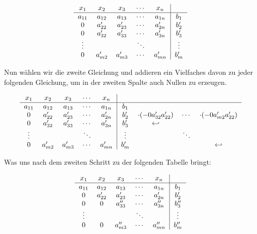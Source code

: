 			\[
				\begin{tabular} {ccccc|c}
					$x_1$ & $x_2$ & $x_3$ & $\cdots$ & $x_n$ &\\
					\hline
					$a_{11}$ & $a_{12}$ & $a_{13}$ & $\cdots$ & $a_{1n}$ & $b_1$\\
					0 & $a_{22}'$ & $a_{23}'$ & $\cdots$ & $a_{2n}'$ & $b_2'$\\
					0 & $a_{32}'$ & $a_{33}'$ & $\cdots$ & $a_{3n}'$ & $b_3'$\\
					$\vdots$ & & & $\ddots$ & & $\vdots$\\
					0 & $a_{m2}'$ & $a_{m3}'$ & $\cdots$ & $a_{mn}'$ & $b_m'$\\
				\end{tabular}
			\]
			
			\noindent Nun w\"ahlen wir die zweite Gleichung und addieren ein Vielfaches davon zu jeder folgenden Gleichung,
			um in der zweiten Spalte auch Nullen zu erzeugen.
			
			\[
				\begin{tabular} {ccccc|cccc}
					$x_1$ & $x_2$ & $x_3$ & $\cdots$ & $x_n$ & & & & \\
					\hline
					$a_{11}$ & $a_{12}$ & $a_{13}$ & $\cdots$ & $a_{1n}$ & $b_1$ & & \\
					0 & $a_{22}'$ & $a_{23}'$ & $\cdots$ & $a_{2n}'$ & $b_2'$ & $\cdot (-\frac {a_{32}'}{a_{22}'})$ & $\cdots$ & $\cdot (-\frac {a_{m2}'}{a_{22}'})$\\
					0 & $a_{32}'$ & $a_{33}'$ & $\cdots$ & $a_{3n}'$ & $b_3'$ & $\hookleftarrow$ & & \\
					$\vdots$ & & & $\ddots$ & & $\vdots$ & & $\ddots$ & \\
					0 & $a_{m2}'$ & $a_{m3}'$ & $\cdots$ & $a_{mn}'$ & $b_m'$ & & & $\hookleftarrow$  \\
				\end{tabular}
			\]
			
			\noindent Was uns nach dem zweiten Schritt zu der folgenden Tabelle bringt:
			
			\[
				\begin{tabular} {ccccc|c}
					$x_1$ & $x_2$ & $x_3$ & $\cdots$ & $x_n$ &\\
					\hline
					$a_{11}$ & $a_{12}$ & $a_{13}$ & $\cdots$ & $a_{1n}$ & $b_1$\\
					0 & $a_{22}'$ & $a_{23}'$ & $\cdots$ & $a_{2n}'$ & $b_2'$\\
					0 & 0 & $a_{33}''$ & $\cdots$ & $a_{3n}''$ & $b_3''$\\
					$\vdots$ & & & $\ddots$ & & $\vdots$\\
					0 & 0 & $a_{m3}''$ & $\cdots$ & $a_{mn}''$ & $b_m''$\\
				\end{tabular}
			\]
			
